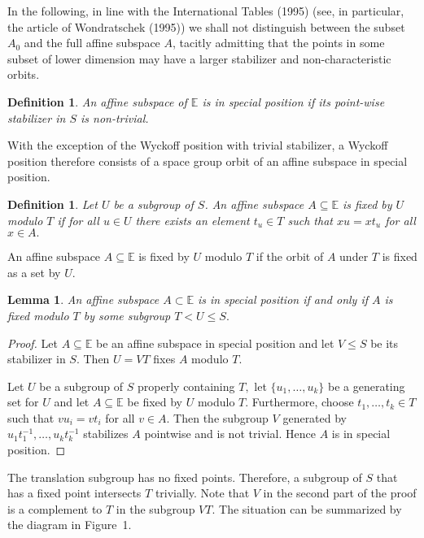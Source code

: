 \documentclass[12pt]{amsart}
\newcommand{\E}{{\mathbb E}}
\newtheorem{definition}[theorem]{Definition}
\newtheorem{lemma}[theorem]{Lemma}
\begin{document}
In the following, in line with the International Tables (1995)
(see, in particular, the article of Wondratschek (1995))
we shall not distinguish between the subset $A_0$ and the full affine 
subspace $A$, tacitly admitting that the points in some subset of 
lower dimension may have a larger stabilizer and non-characteristic
orbits. 
 
\begin{definition}\label{specpos}\label{wyckoff}
An affine subspace of $\E$ is  in {\em special position}  if its 
point-wise stabilizer in $S$ is non-trivial.  
\end{definition}

With the exception of the Wyckoff position with trivial stabilizer,
a Wyckoff position therefore consists of a space group orbit of
an affine subspace in special position.

\begin{definition}
Let $U$ be a subgroup of $S$.
An affine subspace $A\subseteq \E$ is {\em fixed by $U$ modulo $T$} 
if for all $u\in U$ there exists an element $t_{u}\in T$ such that 
$xu = xt_{u}$ for all $x\in A.$
\end{definition}

An affine subspace $A\subseteq \E$ is fixed by $U$ modulo $T$ if the orbit 
of $A$ under $T$ is fixed as a set by $U$.

\begin{lemma}\label{lspecial}
An affine subspace $A\subset\E$ is in special position if and only if $A$ 
is fixed modulo $T$ by some subgroup $T< U\leq S.$
\end{lemma}
\begin{proof} Let $A\subseteq\E$ be an affine subspace in special position 
and let $V\leq S$ be its stabilizer in $S.$  Then $U = VT$ fixes $A$ modulo 
$T.$

Let $U$ be a subgroup of $S$ properly containing $T,$ let 
$\{u_{1},\ldots,u_{k}\}$ be a generating set for $U$ and let 
$A\subseteq\E$ be fixed by $U$ modulo $T.$ Furthermore, choose 
$t_{1},\ldots,t_{k}\in T$ such that $vu_{i}=vt_{i}$ for all $v\in A.$ 
Then the subgroup $V$ generated by 
$u_{1}t_{1}^{-1},\ldots,u_{k}t_{k}^{-1}$ stabilizes $A$ pointwise and 
is not trivial.  Hence $A$ is in special position.
\end{proof}

The translation subgroup has no fixed points.  Therefore, a subgroup 
of $S$ that has a fixed point intersects $T$ trivially. Note that $V$ in 
the second part of the proof is a complement to $T$ in the subgroup 
$VT.$ The situation can be summarized by the diagram in Figure~1.
\end{document}
